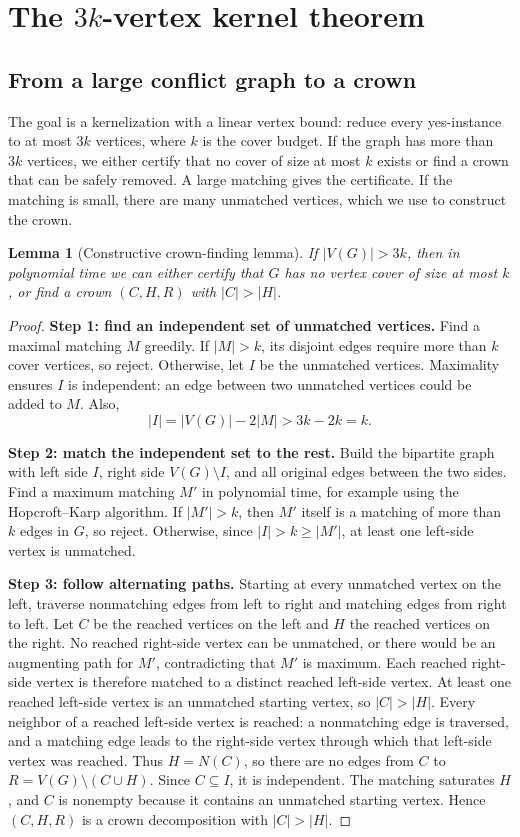 \documentclass[11pt]{article}
\newtheorem{lemma}[theorem]{Lemma}
\begin{document}
\section{The $3k$-vertex kernel theorem}

\subsection{From a large conflict graph to a crown}

The goal is a kernelization with a linear vertex bound: reduce every yes-instance to at most $3k$ vertices, where $k$ is the cover budget. If the graph has more than $3k$ vertices, we either certify that no cover of size at most $k$ exists or find a crown that can be safely removed. A large matching gives the certificate. If the matching is small, there are many unmatched vertices, which we use to construct the crown.

\begin{lemma}[Constructive crown-finding lemma]
If $|V(G)|>3k$, then in polynomial time we can either certify that $G$ has no vertex cover of size at most $k$, or find a crown $(C,H,R)$ with $|C|>|H|$.
\end{lemma}
\begin{proof}
\textbf{Step 1: find an independent set of unmatched vertices.} Find a maximal matching $M$ greedily. If $|M|>k$, its disjoint edges require more than $k$ cover vertices, so reject. Otherwise, let $I$ be the unmatched vertices. Maximality ensures $I$ is independent: an edge between two unmatched vertices could be added to $M$. Also,
\[
|I|=|V(G)|-2|M|>3k-2k=k.
\]

\textbf{Step 2: match the independent set to the rest.} Build the bipartite graph with left side $I$, right side $V(G)\setminus I$, and all original edges between the two sides. Find a maximum matching $M'$ in polynomial time, for example using the Hopcroft--Karp algorithm. If $|M'|>k$, then $M'$ itself is a matching of more than $k$ edges in $G$, so reject. Otherwise, since $|I|>k\geq |M'|$, at least one left-side vertex is unmatched.

\textbf{Step 3: follow alternating paths.} Starting at every unmatched vertex on the left, traverse nonmatching edges from left to right and matching edges from right to left. Let $C$ be the reached vertices on the left and $H$ the reached vertices on the right. No reached right-side vertex can be unmatched, or there would be an augmenting path for $M'$, contradicting that $M'$ is maximum. Each reached right-side vertex is therefore matched to a distinct reached left-side vertex. At least one reached left-side vertex is an unmatched starting vertex, so $|C|>|H|$. Every neighbor of a reached left-side vertex is reached: a nonmatching edge is traversed, and a matching edge leads to the right-side vertex through which that left-side vertex was reached. Thus $H=N(C)$, so there are no edges from $C$ to $R=V(G)\setminus(C\cup H)$. Since $C\subseteq I$, it is independent. The matching saturates $H$, and $C$ is nonempty because it contains an unmatched starting vertex. Hence $(C,H,R)$ is a crown decomposition with $|C|>|H|$.
\end{proof}
\end{document}
